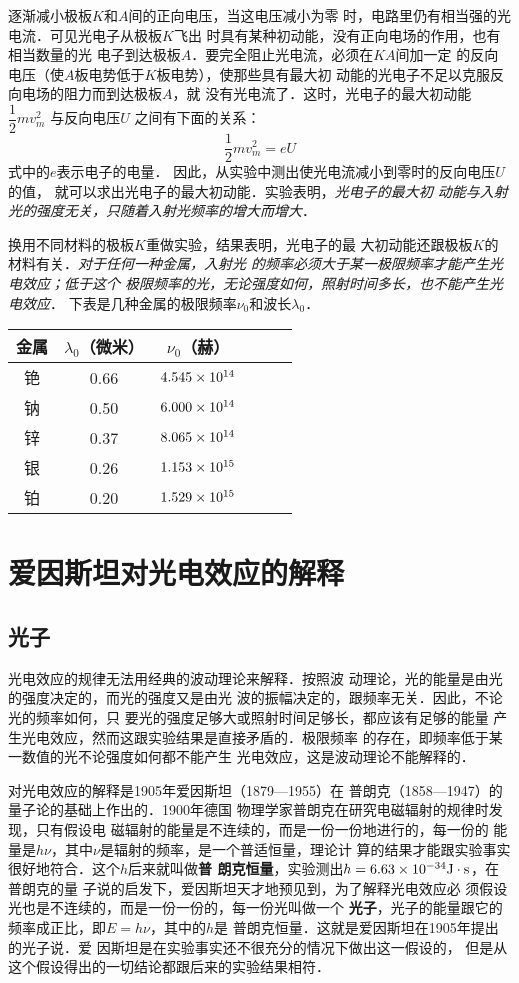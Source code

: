 逐渐减小极板$K$和$A$间的正向电压，当这电压减小为零
时，电路里仍有相当强的光电流．可见光电子从极板$K$飞出
时具有某种初动能，没有正向电场的作用，也有相当数量的光
电子到达极板$A$．要完全阻止光电流，必须在$KA$间加一定
的反向电压（使$A$板电势低于$K$板电势），使那些具有最大初
动能的光电子不足以克服反向电场的阻力而到达极板$A$，就
没有光电流了．这时，光电子的最大初动能
$\dfrac{1}{2}mv^2_m$
与反向电压$U$
之间有下面的关系：
\[\dfrac{1}{2}mv^2_m=eU \]
式中的$e$表示电子的电量．
因此，从实验中测出使光电流减小到零时的反向电压$U$的值，
就可以求出光电子的最大初动能．实验表明，\textit{光电子的最大初
动能与入射光的强度无关，只随着入射光频率的增大而增大}．

换用不同材料的极板$K$重做实验，结果表明，光电子的最
大初动能还跟极板$K$的材料有关．\textit{对于任何一种金属，入射光
的频率必须大于某一极限频率才能产生光电效应；低于这个
极限频率的光，无论强度如何，照射时间多长，也不能产生光
电效应}．
下表是几种金属的极限频率$\nu_0$和波长$\lambda_0$．
\begin{center}
    \begin{tabular}{cccccc}
        \hline
        金属& $\lambda_0$（微米）& $\nu_0$（赫）\\
        \hline
        铯&0.66&$4.545\times 10^{14}$ \\
        钠&0.50&$6.000\times 10^{14}$\\
        锌&0.37&$8.065\times 10^{14}$\\
        银&0.26&$1.153\times 10^{15}$\\
        铂& 0.20&$1.529\times 10^{15}$\\
        \hline
    \end{tabular}
\end{center}



\section{爱因斯坦对光电效应的解释}
\subsection{光子}
光电效应的规律无法用经典的波动理论来解释．按照波
动理论，光的能量是由光的强度决定的，而光的强度又是由光
波的振幅决定的，跟频率无关．因此，不论光的频率如何，只
要光的强度足够大或照射时间足够长，都应该有足够的能量
产生光电效应，然而这跟实验结果是直接矛盾的．极限频率
的存在，即频率低于某一数值的光不论强度如何都不能产生
光电效应，这是波动理论不能解释的．

对光电效应的解释是1905年爱因斯坦（1879—1955）在
普朗克（1858—1947）的量子论的基础上作出的．1900年德国
物理学家普朗克在研究电磁辐射的规律时发现，只有假设电
磁辐射的能量是不连续的，而是一份一份地进行的，每一份的
能量是$h\nu$，其中$\nu$是辐射的频率，是一个普适恒量，理论计
算的结果才能跟实验事实很好地符合．这个$h$后来就叫做\textbf{普
朗克恒量}，实验测出$h=6.63\times10^{-34}{\rm J}\cdot {\rm s}$，在普朗克的量
子说的启发下，爱因斯坦天才地预见到，为了解释光电效应必
须假设光也是不连续的，而是一份一份的，每一份光叫做一个
\textbf{光子}，光子的能量跟它的频率成正比，即$E=h\nu$，其中的$h$是
普朗克恒量．这就是爱因斯坦在1905年提出的光子说．爱
因斯坦是在实验事实还不很充分的情况下做出这一假设的，
但是从这个假设得出的一切结论都跟后来的实验结果相符．

